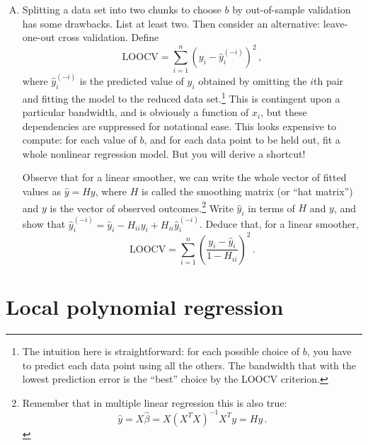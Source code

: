 \documentclass{mynotes}
\begin{document}
\begin{enumerate}[(A)]
\item Splitting a data set into two chunks to choose $b$ by out-of-sample validation has some drawbacks.  List at least two.  Then consider an alternative: leave-one-out cross validation.  Define
$$
\mbox{LOOCV} = \sum_{i=1}^n \left( y_i - \hat{y}_{i}^{(-i)} \right)^2 \, ,
$$
where $\hat{y}_{i}^{(-i)} $ is the predicted value of $y_i$ obtained by omitting the $i$th pair and fitting the model to the reduced data set.\footnote{The intuition here is straightforward: for each possible choice of $b$, you have to predict each data point using all the others.  The bandwidth that with the lowest prediction error is the ``best'' choice by the LOOCV criterion.}  This is contingent upon a particular bandwidth, and is obviously a function of $x_i$, but these dependencies are suppressed for notational ease.  This looks expensive to compute: for each value of $b$, and for each data point to be held out, fit a whole nonlinear regression model.  But you will derive a shortcut!

Observe that for a linear smoother, we can write the whole vector of fitted values as $\hat{y} = H y$, where $H$ is called the smoothing matrix (or ``hat matrix'') and $y$ is the vector of observed outcomes.\footnote{Remember that in multiple linear regression this is also true: $$\hat{y} = X \hat{\beta} = X (X^T X)^{-1} X^T y = Hy \, .$$}  Write $\hat{y}_i$ in terms of $H$ and $y$, and show that $\hat{y}_i^{(-i)} = \hat{y}_i - H_{ii} y_i + H_{ii} \hat{y}_i^{(-i)}$.  Deduce that, for a linear smoother,
$$
\mbox{LOOCV} = \sum_{i=1}^n \left( \frac{  y_i - \hat{y}_{i} } {1-H_{ii}} \right)^2 \, .
$$


\end{enumerate}

\section{Local polynomial regression}
\end{document}
